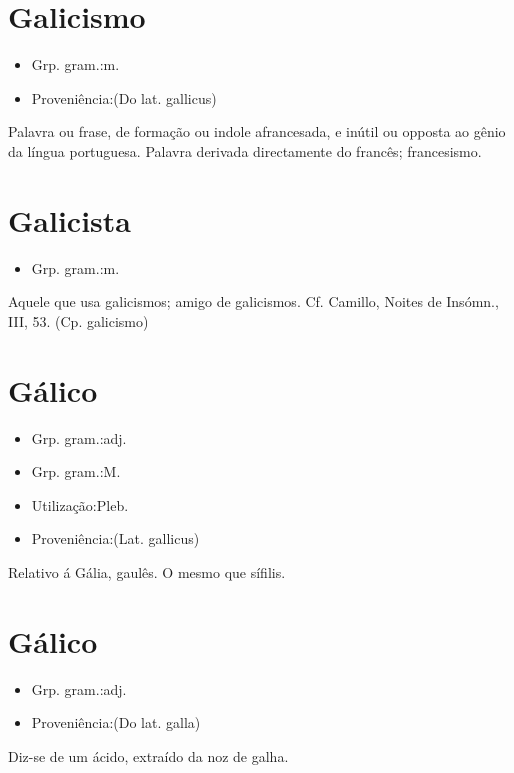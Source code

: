 \section{Galicismo}
\begin{itemize}
\item {Grp. gram.:m.}
\end{itemize}
\begin{itemize}
\item {Proveniência:(Do lat. \textunderscore gallicus\textunderscore )}
\end{itemize}
Palavra ou frase, de formação ou indole afrancesada, e inútil ou opposta ao gênio da língua portuguesa.
Palavra derivada directamente do francês; francesismo.
\section{Galicista}
\begin{itemize}
\item {Grp. gram.:m.}
\end{itemize}
Aquele que usa galicismos; amigo de galicismos. Cf. Camillo, \textunderscore Noites de Insómn.\textunderscore , III, 53.
(Cp. \textunderscore galicismo\textunderscore )
\section{Gálico}
\begin{itemize}
\item {Grp. gram.:adj.}
\end{itemize}
\begin{itemize}
\item {Grp. gram.:M.}
\end{itemize}
\begin{itemize}
\item {Utilização:Pleb.}
\end{itemize}
\begin{itemize}
\item {Proveniência:(Lat. \textunderscore gallicus\textunderscore )}
\end{itemize}
Relativo á Gália, gaulês.
O mesmo que \textunderscore sífilis\textunderscore .
\section{Gálico}
\begin{itemize}
\item {Grp. gram.:adj.}
\end{itemize}
\begin{itemize}
\item {Proveniência:(Do lat. \textunderscore galla\textunderscore )}
\end{itemize}
Diz-se de um ácido, extraído da noz de galha.
